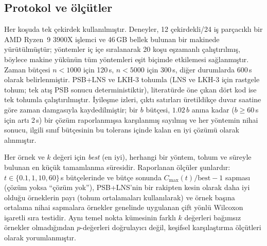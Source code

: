 \subsection{Protokol ve ölçütler}
Her koşuda tek çekirdek kullanılmıştır. Deneyler, 12 çekirdekli/24 iş parçacıklı bir AMD Ryzen~9 3900X
işlemci ve 46\,GB bellek bulunan bir makinede yürütülmüştür; yöntemler iç içe sıralanarak 20 koşu eşzamanlı
çalıştırılmış, böylece makine yükünün tüm yöntemleri eşit biçimde etkilemesi sağlanmıştır. Zaman bütçesi
$n<1000$ için 120\,s, $n<5000$ için 300\,s, diğer durumlarda 600\,s olarak belirlenmiştir. PSB+LNS ve LKH-3
\SeedsMain{} tohumla (LNS ve LKH-3 için rastgele tohum; tek atış PSB sonucu
deterministiktir), literatürde öne çıkan dört kod ise tek tohumla çalıştırılmıştır. İyileşme izleri,
çıktı satırları üretildikçe duvar saatine göre zaman damgasıyla kaydedilmiştir; bir $b$ bütçesi,
$1.02\,b$ anına kadar ($b\ge 60$\,s için artı 2\,s) bir çözüm raporlanmışsa karşılanmış
sayılmış ve her yöntemin nihai sonucu, ilgili sınıf bütçesinin bu tolerans içinde kalan en iyi
çözümü olarak alınmıştır.

Her örnek ve $k$ değeri için \emph{best} (en iyi), herhangi bir yöntem, tohum ve süreyle bulunan en küçük
tamamlanma süresidir. Raporlanan ölçüler şunlardır: $t\in\{0.1,1,10,60\}$\,s bütçelerinde
ve bütçe sonunda $C_{\max}(t)/\text{best}-1$ sapması (çözüm yoksa ``çözüm yok''),
PSB+LNS'nin bir rakipten kesin olarak daha iyi olduğu örneklerin payı
(tohum ortalamaları kullanılarak) ve örnek başına ortalama nihai sapmalara
örnekler genelinde uygulanan çift yönlü Wilcoxon işaretli sıra testidir. Aynı temel
nokta kümesinin farklı $k$ değerleri bağımsız örnekler olmadığından $p$-değerleri
doğrulayıcı değil, keşifsel karşılaştırma ölçütleri olarak yorumlanmıştır.

